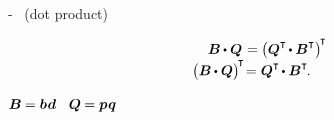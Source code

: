 \dotproductinquotes\hbox{-}~%
(dot product)

\nopagebreak\vspace{-0.2em}
\begin{equation}\label{transposeofdotproductforbivalenttensors}
\begin{array}{r@{\hspace{.8ex}}c@{\hspace{.8ex}}l}
\bm{B} \hspace{-0.1ex} \dotp \bm{Q} & = & \hspace{-0.2ex} \bigl( \bm{Q}^{\T} \hspace{-0.2ex}\dotp \bm{B}^{\T} \bigr)^{\hspace{-0.25ex}\T}
\\[.1em]
\bigl( \bm{B} \hspace{-0.1ex} \dotp \bm{Q} \bigr)^{\hspace{-0.25ex}\T} \hspace{-0.4ex} & \hspace{-0.4ex} = & \hspace{-0.3ex} \bm{Q}^{\T} \hspace{-0.2ex}\dotp \bm{B}^{\T}
\hspace{-0.2ex} .
\end{array}
\end{equation}

\noindent
{}
${\bm{B} \hspace{-0.1ex} = \bm{b} \hspace{.1ex} \bm{d}}$
~${\bm{Q} \hspace{-0.1ex} = \bm{p} \hspace{.1ex} \bm{q}}$

